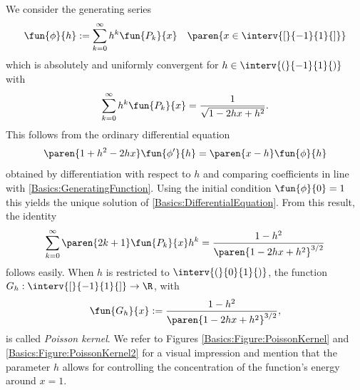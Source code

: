 \begin{example}
We consider the generating series
\begin{equation}
  \label{Basics:GeneratingFunction}
  \fun{\phi}{h} := \sum_{k = 0}^{\infty} h^k \fun{P_k}{x} \quad \paren{x \in \interv{[}{-1}{1}{]}}
\end{equation}
which is absolutely and uniformly convergent for $h \in
\interv{(}{-1}{1}{)}$ with
\begin{equation}
  \nonumber
  \sum_{k = 0}^{\infty} h^k \fun{P_k}{x} = \frac{1}{\sqrt{1-2hx+h^2}}.
\end{equation}
This follows from the ordinary differential equation
\begin{equation}
\label{Basics:DifferentialEquation}
  \paren{1+h^2-2hx}\fun{\phi'}{h} = \paren{x-h}\fun{\phi}{h}
\end{equation}
obtained by differentiation with respect to $h$ and comparing coefficients in line with \eqref{Basics:GeneratingFunction}. Using the initial 
condition $\fun{\phi}{0}=1$ this yields the unique solution of \eqref{Basics:DifferentialEquation}.
From this result, the identity
\begin{equation}
  \nonumber
  \sum_{k=0}^{\infty} \paren{2k+1} \fun{P_k}{x} h^k =
  \frac{1-h^2}{\paren{1-2hx+h^2}^{3/2}}
\end{equation}
 follows easily. When $h$ is restricted to $\interv{(}{0}{1}{)}$, the function
$G_h:\interv{[}{-1}{1}{]} \rightarrow \R$, with
\begin{equation}
  \label{PoissonKernel}
  \nonumber
  \fun{G_h}{x} := \frac{1-h^2}{\paren{1-2hx+h^2}^{3/2}},
\end{equation}
is called \emph{Poisson kernel}. We refer 
to Figures \ref{Basics:Figure:PoissonKernel} and \ref{Basics:Figure:PoissonKernel2}
for a visual impression and mention that the parameter $h$
allows for controlling the concentration of the function's energy around
$x = 1$.
\end{example}

